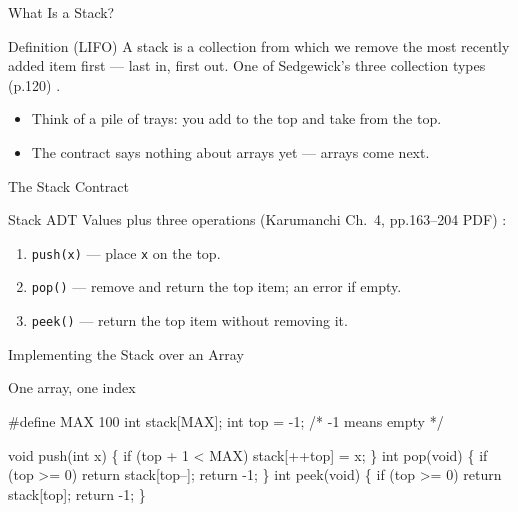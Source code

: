 \documentclass[aspectratio=169]{beamer}
\begin{document}
\begin{frame}{What Is a Stack?}
  \begin{block}{Definition (LIFO)}
    A stack is a collection from which we remove the most recently added
    item first --- last in, first out. One of Sedgewick's three collection
    types (p.120) \cite{Sedgewick2011_algorithms}.
  \end{block}
  \begin{itemize}
    \item Think of a pile of trays: you add to the top and take from the top.
    \item The contract says nothing about arrays yet --- arrays come next.
  \end{itemize}
\end{frame}

\begin{frame}{The Stack Contract}
  \begin{block}{Stack ADT}
    Values plus three operations (Karumanchi Ch.~4, pp.163--204 PDF)
    \cite{Karumanchi2017_data_structures_algorithms_made_easy}:
  \end{block}
  \begin{enumerate}
    \item \texttt{push(x)} --- place \texttt{x} on the top.
    \item \texttt{pop()} --- remove and return the top item; an error if empty.
    \item \texttt{peek()} --- return the top item without removing it.
  \end{enumerate}
\end{frame}

\begin{frame}[fragile]{Implementing the Stack over an Array}
  \begin{block}{One array, one index}
\begin{semiverbatim}
#define MAX 100
int stack[MAX];
int top = -1;   /* -1 means empty */
\end{semiverbatim}
  \end{block}
\begin{semiverbatim}
void push(int x) \{ if (top + 1 < MAX) stack[++top] = x; \}
int pop(void)  \{ if (top >= 0) return stack[top--]; return -1; \}
int peek(void) \{ if (top >= 0) return stack[top]; return -1; \}
\end{semiverbatim}
\end{frame}
\end{document}
